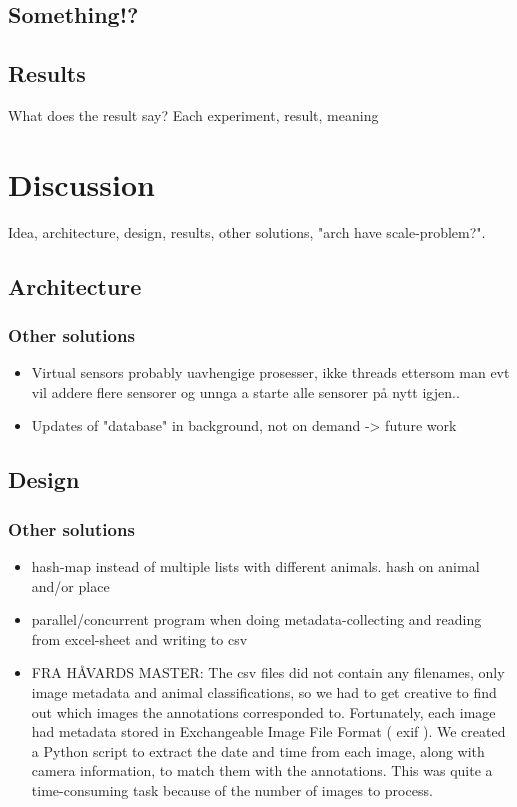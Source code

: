 \documentclass[USenglish]{uit-thesis}
\begin{document}
\section{Something!?}
\section{Results}
What does the result say?
Each experiment, result, meaning

\chapter{Discussion}
Idea, architecture, design, results, other solutions, "arch have scale-problem?".

\section{Architecture}
\subsection{Other solutions}
\begin{itemize}
\item Virtual sensors probably uavhengige prosesser, ikke threads ettersom man evt vil addere flere sensorer og unnga a starte alle sensorer på nytt igjen..
\item Updates of "database" in background, not on demand -> future work
\end{itemize}

\section{Design}
\subsection{Other solutions}
\begin{itemize}
\item hash-map instead of multiple lists with different animals. hash on animal and/or place
\item parallel/concurrent program when doing metadata-collecting and reading from excel-sheet and writing to csv
\item FRA HÅVARDS MASTER: The csv files did not contain any filenames,
only image metadata and animal classifications, so we had to get creative
to find out which images the annotations corresponded to. Fortunately, each
image had metadata stored in Exchangeable Image File Format ( exif ). We
created a Python script to extract the date and time from each image, along
with camera information, to match them with the annotations. This was quite
a time-consuming task because of the number of images to process.
\end{itemize}
\end{document}
